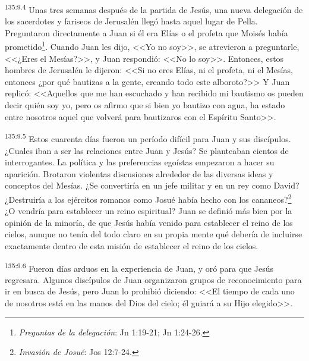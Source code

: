 \par 
\textsuperscript{135:9.4} Unas tres semanas después de la partida de Jesús, una nueva delegación de los sacerdotes y fariseos de Jerusalén llegó hasta aquel lugar de Pella. Preguntaron directamente a Juan si él era Elías o el profeta que Moisés había prometido\footnote{\textit{Preguntas de la delegación}: Jn 1:19-21; Jn 1:24-26.}. Cuando Juan les dijo, <<Yo no soy>>, se atrevieron a preguntarle, <<¿Eres el Mesías?>>, y Juan respondió: <<No lo soy>>. Entonces, estos hombres de Jerusalén le dijeron: <<Si no eres Elías, ni el profeta, ni el Mesías, entonces ¿por qué bautizas a la gente, creando todo este alboroto?>> Y Juan replicó: <<Aquellos que me han escuchado y han recibido mi bautismo os pueden decir quién soy yo, pero os afirmo que si bien yo bautizo con agua, ha estado entre nosotros aquel que volverá para bautizaros con el Espíritu Santo>>.

\par 
\textsuperscript{135:9.5} Estos cuarenta días fueron un período difícil para Juan y sus discípulos. ¿Cuales iban a ser las relaciones entre Juan y Jesús? Se planteaban cientos de interrogantes. La política y las preferencias egoístas empezaron a hacer su aparición. Brotaron violentas discusiones alrededor de las diversas ideas y conceptos del Mesías. ¿Se convertiría en un jefe militar y en un rey como David? ¿Destruiría a los ejércitos romanos como Josué había hecho con los cananeos?\footnote{\textit{Invasión de Josué}: Jos 12:7-24.} ¿O vendría para establecer un reino espiritual? Juan se definió más bien por la opinión de la minoría, de que Jesús había venido para establecer el reino de los cielos, aunque no tenía del todo claro en su propia mente qué debería de incluirse exactamente dentro de esta misión de establecer el reino de los cielos.

\par 
\textsuperscript{135:9.6} Fueron días arduos en la experiencia de Juan, y oró para que Jesús regresara. Algunos discípulos de Juan organizaron grupos de reconocimiento para ir en busca de Jesús, pero Juan lo prohibió diciendo: <<El tiempo de cada uno de nosotros está en las manos del Dios del cielo; él guiará a su Hijo elegido>>.

